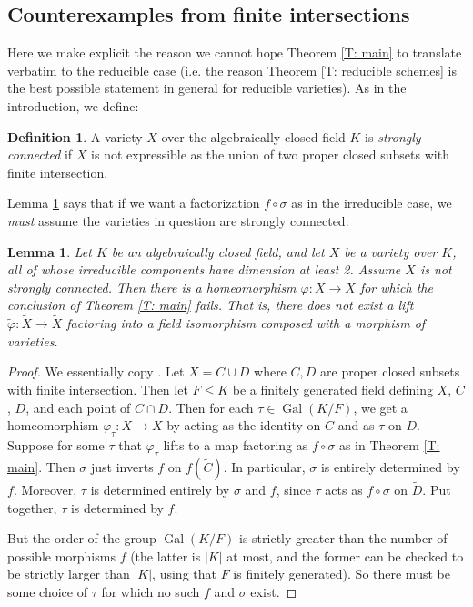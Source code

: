 \documentclass{amsart}
\newtheorem{lemma}[theorem]{Lemma}
\theoremstyle{definition}
\newtheorem{definition}[theorem]{Definition}
\begin{document}
\subsection{Counterexamples from finite intersections}

Here we make explicit the reason we cannot hope Theorem \ref{T: main} to translate verbatim to the reducible case (i.e. the reason Theorem \ref{T: reducible schemes} is the best possible statement in general for reducible varieties). As in the introduction, we define:

\begin{definition}
    A variety $X$ over the algebraically closed field $K$ is \textit{strongly connected} if $X$ is not expressible as the union of two proper closed subsets with finite intersection.
\end{definition}

Lemma \ref{L: counterexample reducible} says that if we want a factorization $f\circ\sigma$ as in the irreducible case, we \textit{must} assume the varieties in question are strongly connected:

\begin{lemma}\label{L: counterexample reducible}
Let $K$ be an algebraically closed field, and let $X$ be a variety over $K$, all of whose irreducible components have dimension at least 2. Assume $X$ is not strongly connected. Then there is a homeomorphism $\varphi:X\rightarrow X$ for which the conclusion of Theorem \ref{T: main} fails. That is, there does not exist a lift $\widetilde\varphi:\widetilde X\rightarrow\widetilde X$ factoring into a field isomorphism composed with a morphism of varieties.
\end{lemma}
\begin{proof}
    We essentially copy \cite[Lemma 10.10]{CasHasAV}. Let $X=C\cup D$ where $C,D$ are proper closed subsets with finite intersection. Then let $F\leq K$ be a finitely generated field defining $X$, $C$, $D$, and each point of $C\cap D$. Then for each $\tau\in\operatorname{Gal}(K/F)$, we get a homeomorphism $\varphi_\tau:X\rightarrow X$ by acting as the identity on $C$ and as $\tau$ on $D$. Suppose for some $\tau$ that $\varphi_\tau$ lifts to a map factoring as $f\circ\sigma$ as in Theorem \ref{T: main}. Then $\sigma$ just inverts $f$ on $f(\widetilde C)$. In particular, $\sigma$ is entirely determined by $f$. Moreover, $\tau$ is determined entirely by $\sigma$ and $f$, since $\tau$ acts as $f\circ\sigma$ on $\widetilde D$. Put together, $\tau$ is determined by $f$.

    But the order of the group $\operatorname{Gal}(K/F)$ is strictly greater than the number of possible morphisms $f$ (the latter is $|K|$ at most, and the former can be checked to be strictly larger than $|K|$, using that $F$ is finitely generated). So there must be some choice of $\tau$ for which no such $f$ and $\sigma$ exist.
\end{proof}
\end{document}
